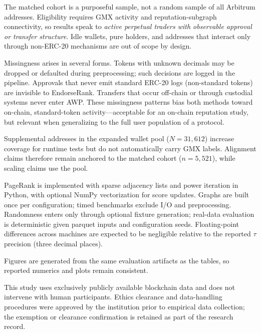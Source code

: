 The matched cohort is a purposeful sample, not a random sample of all Arbitrum addresses. Eligibility requires GMX activity and reputation-subgraph connectivity, so results speak to \emph{active perpetual traders with observable approval or transfer structure}. Idle wallets, pure holders, and addresses that interact only through non-ERC-20 mechanisms are out of scope by design.

Missingness arises in several forms. Tokens with unknown decimals may be dropped or defaulted during preprocessing; such decisions are logged in the pipeline. Approvals that never emit standard ERC-20 logs (non-standard tokens) are invisible to EndorseRank. Transfers that occur off-chain or through custodial systems never enter AWP. These missingness patterns bias both methods toward on-chain, standard-token activity---acceptable for an on-chain reputation study, but relevant when generalizing to the full user population of a protocol.

Supplemental addresses in the expanded wallet pool ($N=31{,}612$) increase coverage for runtime tests but do not automatically carry GMX labels. Alignment claims therefore remain anchored to the matched cohort ($n=5{,}521$), while scaling claims use the pool.


PageRank is implemented with sparse adjacency lists and power iteration in Python, with optional NumPy vectorization for score updates. Graphs are built once per configuration; timed benchmarks exclude I/O and preprocessing. Randomness enters only through optional fixture generation; real-data evaluation is deterministic given parquet inputs and configuration seeds. Floating-point differences across machines are expected to be negligible relative to the reported $\tau$ precision (three decimal places).

Figures are generated from the same evaluation artifacts as the tables, so reported numerics and plots remain consistent.


This study uses exclusively publicly available blockchain data and does not intervene with human participants. Ethics clearance and data-handling procedures were approved by the institution prior to empirical data collection; the exemption or clearance confirmation is retained as part of the research record.

